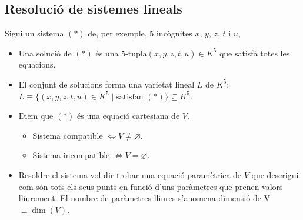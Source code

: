 \subsection{Resolució de sistemes lineals}
Sigui un sistema $(\ast)$ de, per exemple, 5 incògnites $x$, $y$, $z$, $t$ i $u$,
\begin{itemize}
    \item Una solució de $(\ast)$ és una $5\text{-tupla} (x,y,z,t,u) \in K^{5}$ que satisfà totes les equacions.
    \item El conjunt de solucions forma una varietat lineal $L$ de $K^{5}$:
        \subitem $L \equiv \{ (x,y,z,t,u) \in K^{5} \mid \text{satisfan } (\ast) \} \subseteq K^{5}$.
    \item Diem que $(\ast)$ és una equació cartesiana de $V$.
    \begin{itemize}
        \item Sistema compatible $\Leftrightarrow V \neq \varnothing$.
        \item Sistema incompatible $\Leftrightarrow V = \varnothing$.
    \end{itemize}
    \item Resoldre el sistema vol dir trobar una equació paramètrica de $V$ que descrigui com són tots els seus punts en funció d'uns paràmetres que prenen valors lliurement. El nombre de paràmetres lliures s'anomena dimensió de V $\equiv \dim{(V)}$.
    \end{itemize}

